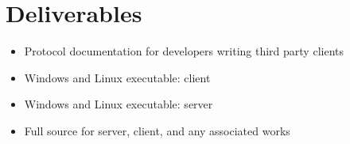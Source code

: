 \section{Deliverables}
\begin{itemize}
\item Protocol documentation for developers writing third party clients
\item Windows and Linux executable: client
\item Windows and Linux executable: server
\item Full source for server, client, and any associated works
\end{itemize}
